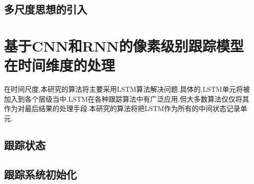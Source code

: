 \subsection{多尺度思想的引入}

\section{基于CNN和RNN的像素级别跟踪模型在时间维度的处理}
\par
\par
在时间尺度,本研究的算法将主要采用LSTM算法解决问题.具体的,LSTM单元将被加入到各个层级当中.LSTM在各种跟踪算法中有广泛应用,但大多数算法仅仅将其作为对最后结果的处理手段.本研究的算法将把LSTM作为所有的中间状态记录单元.
\subsection{跟踪状态}
\subsection{跟踪系统初始化}